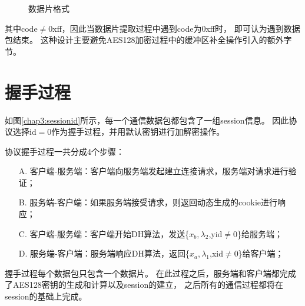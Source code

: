 \begin{small}
\begin{figure}[h]
{
}
\caption{数据片格式}\label{chap3:package}
\end{figure}
\end{small}

其中code$\ne$0xff，因此当数据片提取过程中遇到code为0xff时，
即可认为遇到数据包结束。
这种设计主要避免AES128加密过程中的缓冲区补全操作引入的额外字节。

\section{握手过程}

如图\ref{chap3:sessionid}所示，每一个通信数据包都包含了一组session信息。
因此协议选择id$=$0作为握手过程，并用默认密钥进行加解密操作。

协议握手过程一共分成4个步骤：

\begin{itemize}
    \item [A.] 客户端-服务端：客户端向服务端发起建立连接请求，服务端对请求进行验证；
    \item [B.] 服务端-客户端：如果服务端接受请求，则返回动态生成的cookie进行响应；
    \item [C.] 客户端-服务端：客户端开始DH算法，发送\{$x_b,\lambda_2$,yid$\ne$0\}给服务端；
    \item [D.] 服务端-客户端：服务端响应DH算法，返回\{$x_a,\lambda_1$,xid$\ne$0\}给客户端；
\end{itemize}

握手过程每个数据包只包含一个数据片。
在此过程之后，服务端和客户端都完成了AES128密钥的生成和计算以及session的建立，
之后所有的通信过程都将在session的基础上完成。

